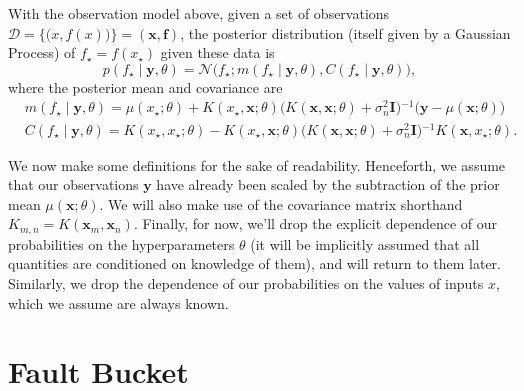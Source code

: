 \documentclass{article} %
\newcommand{\deq}{=}
\newcommand{\given}{\!\ensuremath{\mid}\!}
\newcommand{\cm}[1]{\ensuremath{\mathcal{#1}}}
\newcommand{\bm}[1]{\ensuremath{\mathbf{#1}}}
\newcommand{\data}{\ensuremath{\cm{D}}}
\newcommand{\inv}{\ensuremath{^{-1}}}
\newcommand{\vect}[1]{\bm{#1}}
\newcommand{\vy}{\vect{y}}
\newcommand{\vx}{\vect{x}}
\newcommand{\mean}[2]{{m}(#1\given#2)}
\newcommand{\cov}[2]{{C}(#1\given#2)}
\newcommand{\st}{_{\star}}
\begin{document}
With the observation model above, given a set of observations
$
 \data
 \deq
 \bigl\lbrace
   \bigl( x, f(x) \bigr)
 \bigr\rbrace
 \deq
 ( \bm{x}, \bm{f} )
$,
the posterior distribution (itself given by a Gaussian Process) of $f\st \deq f(x\st)$ given these data is
\begin{equation*}
 p(f\st \given \vy, \theta)
 =
 \cm{N}
 \bigl(
   f\st;
   \mean{f\st}{\vy,\theta},
   \cov{f\st}{\vy,\theta}
 \bigr),
\end{equation*}
where the posterior mean and covariance are
\begin{align*}
 &
 \mean{f\st}{\vy,\theta}
 \deq
 \mu(x\st; \theta)
 +
 K(x\st, \bm{x}; \theta)
 \bigl(
 K(\bm{x}, \bm{x}; \theta) + \sigma_n^2 \bm{I}
 \bigr)\inv
 \bigl(
   \bm{y} - \mu(\bm{x}; \theta)
 \bigr)
 \\  
 &
 \cov{f\st}{\vy,\theta}
 \deq
 K(x\st, x\st; \theta)
 -
 K(x\st, \bm{x}; \theta)
 \bigl(
   K(\bm{x}, \bm{x}; \theta) + \sigma_n^2 \bm{I}
 \bigr)\inv
 K(\bm{x}, x\st; \theta).
\end{align*}

We now make some definitions for the sake of readability. Henceforth,
we assume that our observations $\vy$ have already been scaled by the
subtraction of the prior mean $\mu(\bm{x}; \theta)$. We will also make
use of the covariance matrix shorthand $K_{m,n} \deq
K(\vx_m,\vx_n)$. Finally, for now, we'll drop the explicit dependence
of our probabilities on the hyperparameters $\theta$ (it will be
implicitly assumed that all quantities are conditioned on knowledge of
them), and will return to them later. Similarly, we drop the dependence of our probabilities on the values of inputs $x$, which we assume are always known.

\section{Fault Bucket}\label{bucket}
\end{document}
